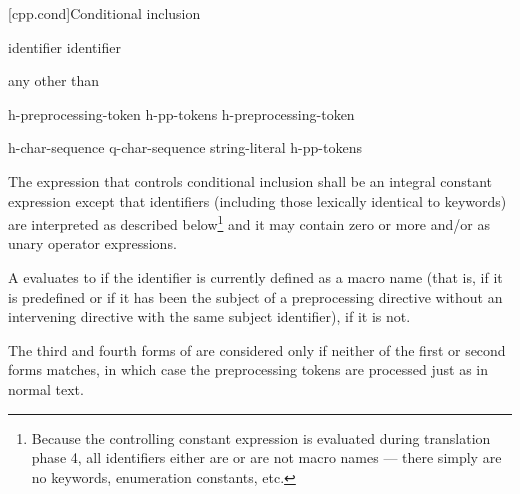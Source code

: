 [cpp.cond]{Conditional inclusion}%
%

%
\begin{ncbnf}
\br
     identifier\br
     identifier \terminal{)}
\end{ncbnf}

\begin{ncbnf}
\br
    \textnormal{any  other than \terminal{>}}
\end{ncbnf}

\begin{ncbnf}
\br
    h-preprocessing-token\br
    h-pp-tokens h-preprocessing-token
\end{ncbnf}

%
\begin{ncbnf}
\br
     h-char-sequence \terminal{> )}\br
     q-char-sequence \br
       string-literal  \terminal{)}\br
     h-pp-tokens     \terminal{> )}
\end{ncbnf}

\pnum
The expression that controls conditional inclusion
shall be an integral constant expression except that
identifiers
(including those lexically identical to keywords)
are interpreted as described below\footnote{Because the controlling constant expression is evaluated
during translation phase 4,
all identifiers either are or are not macro names ---
there simply are no keywords, enumeration constants, etc.}
and it may contain zero or more  and/or
 as unary operator expressions.

\pnum
A  evaluates to 
if the identifier is currently defined
as a macro name
(that is, if it is predefined
or if it has been the subject of a
preprocessing directive
without an intervening
directive with the same subject identifier),  if it is not.

\pnum
The third and fourth forms of 
are considered only if neither of the first or second forms matches,
in which case the preprocessing tokens are processed just as in normal text.


